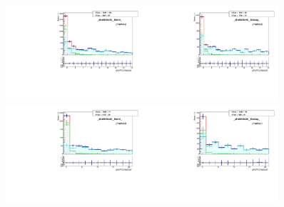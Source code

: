 \begin{figure}[htb]
  \begin{center}
   \includegraphics[width=0.45\textwidth]{../figs/figs_v11/MUON_WGamma/MCclosureWjetsPlusWg/c_TEMPL_CHISO_UNblind__phoEt35to45__Barrel__RooFit_MCclosure.pdf}\includegraphics[width=0.45\textwidth]{../figs/figs_v11/MUON_WGamma/MCclosureWjetsPlusWg/c_TEMPL_CHISO_UNblind__phoEt35to45__Endcap__RooFit_MCclosure.pdf}\\
   \includegraphics[width=0.45\textwidth]{../figs/figs_v11/MUON_WGamma/MCclosureWjetsPlusWg/c_TEMPL_CHISO_UNblind__phoEt45to55__Barrel__RooFit_MCclosure.pdf}\includegraphics[width=0.45\textwidth]{../figs/figs_v11/MUON_WGamma/MCclosureWjetsPlusWg/c_TEMPL_CHISO_UNblind__phoEt45to55__Endcap__RooFit_MCclosure.pdf}\\

\end{center}
\end{figure}
